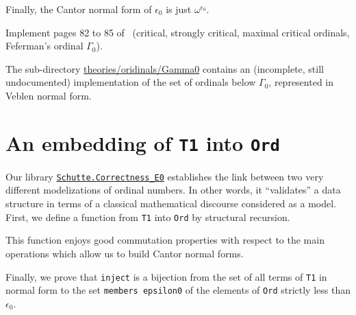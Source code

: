Finally, the Cantor normal form of $\epsilon_0$ is just $\omega^{\epsilon_0}$.




\begin{project}
Implement pages 82 to 85 of~\cite{schutte} (critical, strongly critical, maximal critical ordinals, Feferman's ordinal $\Gamma_0$).
\end{project}

\begin{remark}
The sub-directory
    \href{https://github.com/coq-community/hydra-battles/tree/master/theories/ordinals/Gamma0}{theories/oridinals/Gamma0} contains an (incomplete, still undocumented) implementation of the set of ordinals below $\Gamma_0$, represented in Veblen normal form. 
\end{remark}

\section{An embedding of \texttt{T1} into \texttt{Ord}}


Our library 
\href{../theories/html/hydras.Schutte.Correctness_E0.html}%
{\texttt{Schutte.Correctness\_E0}} establishes the link between two very different modelizations of ordinal numbers. In other words, it ``validates'' a data structure in terms of
a classical mathematical discourse considered as a model. 
First, we define a function from \texttt{T1} into  \texttt{Ord} by structural recursion.




This function enjoys good commutation properties with respect to the main operations which
allow us to build Cantor normal forms.







Finally, we prove that \texttt{inject} is a bijection from the set of all terms of \texttt{T1} in normal form to the set 
\texttt{members epsilon0} of the elements of \texttt{Ord} strictly less than  $\epsilon_0$.

